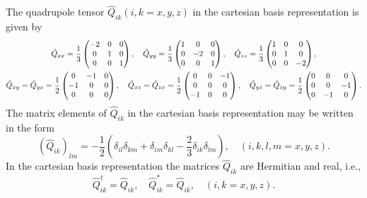 The quadrupole tensor $\widehat{Q}_{i k}(i, k=x, y, z)$ in the cartesian basis representation is given by
\begin{gather}
\hat{Q}_{x x}=\frac{1}{3}\begin{pmatrix}
-2 & 0 & 0 \\
0 & 1 & 0 \\
0 & 0 & 1
\end{pmatrix}, \quad \hat{Q}_{y y}=\frac{1}{3}\begin{pmatrix}
1 & 0 & 0 \\
0 & -2 & 0 \\
0 & 0 & 1
\end{pmatrix}, \quad \hat{Q}_{z z}=\frac{1}{3}\begin{pmatrix}
1 & 0 & 0 \\
0 & 1 & 0 \\
0 & 0 & -2
\end{pmatrix},  \notag\\
\hat{Q}_{x y}=\hat{Q}_{y x}=\frac{1}{2}\begin{pmatrix}
0 & -1 & 0 \\
-1 & 0 & 0 \\
0 & 0 & 0
\end{pmatrix}, \quad \hat{Q}_{x z}=\hat{Q}_{z x}=\frac{1}{2}\begin{pmatrix}
0 & 0 & -1 \\
0 & 0 & 0 \\
-1 & 0 & 0
\end{pmatrix}, \quad \hat{Q}_{y z}=\hat{Q}_{z y}=\frac{1}{2}\begin{pmatrix}
0 & 0 & 0 \\
0 & 0 & -1 \\
0 & -1 & 0
\end{pmatrix} . \label{eq:2:6:28}
\end{gather}
The matrix elements of $\widehat{Q}_{i k}$ in the cartesian basis representation may be written in the form
\begin{equation}
\left(\widehat{Q}_{i k}\right)_{l m}=-\frac{1}{2}\left(\delta_{i l} \delta_{k m}+\delta_{i m} \delta_{k l}-\frac{2}{3} \delta_{i k} \delta_{l m}\right), \quad(i, k, l, m=x, y, z). \label{eq:2:6:29}
\end{equation}
In the cartesian basis representation the matrices $\widehat{Q}_{i k}$ are Hermitian and real, i.e.,
\begin{equation}
\widehat{Q}_{i k}^{\dagger}=\widehat{Q}_{i k}, \quad \widehat{Q}_{i k}^{*}=\widehat{Q}_{i k}, \quad(i, k=x, y, z) . \label{eq:2:6:30}
\end{equation}

